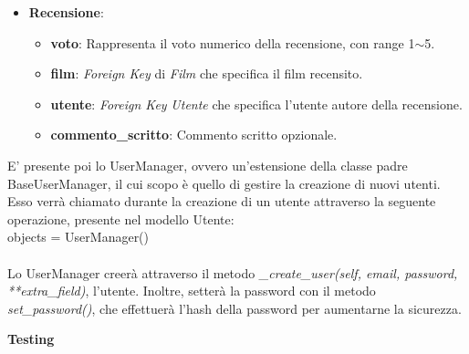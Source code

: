 \documentclass[12pt]{article}
\begin{document}
\begin{itemize}
		
		
		\item \textbf{Recensione}:
		\begin{itemize}
			\item \textbf{voto}: Rappresenta il voto numerico della recensione, con range 1$\sim$5.
			\item \textbf{film}: \textit{Foreign Key} di \textit{Film} che specifica il film recensito.
			\item \textbf{utente}: \textit{Foreign Key} \textit{Utente} che specifica l'utente autore della recensione.
			\item \textbf{commento\_scritto}: Commento scritto opzionale.
		\end{itemize}
	\end{itemize}

	\noindent E' presente poi lo UserManager, ovvero un'estensione della classe padre BaseUserManager, il cui scopo è quello di gestire la creazione di nuovi utenti. Esso verrà chiamato durante la creazione di un utente attraverso la seguente operazione, presente nel modello Utente:\\ \noindent objects = UserManager() \\ \\
	Lo UserManager creerà attraverso il metodo \textit{\_create\_user(self, email, password, **extra\_field)}, l'utente. Inoltre, setterà la password con il metodo \textit{set\_password()}, che effettuerà l'hash della password per aumentarne la sicurezza.

	\pagebreak
	
	
	\noindent \centerline {\Huge \textbf{Testing}} \\
	
\end{document}
